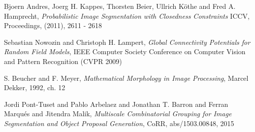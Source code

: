 \begin{thebibliography}{9}
 	Bjoern Andres, Joerg H. Kappes, Thorsten Beier, Ullrich Köthe and Fred A. Hamprecht, 
	\emph{Probabilistic Image Segmentation with Closedness Constraints}
	ICCV, Proceedings, (2011), 2611 - 2618

	Sebastian Nowozin and Christoph H. Lampert, 
	\emph{Global Connectivity Potentials for Random Field Models}, 
	IEEE Computer Society Conference on Computer Vision and Pattern Recognition (CVPR 2009)

 	S. Beucher and F. Meyer,
 	\emph{Mathematical  Morphology  in  Image  Processing}, 
 	Marcel Dekker, 1992, ch. 12

 	Jordi Pont{-}Tuset and Pablo Arbelaez and Jonathan T. Barron and Ferran Marqu{\'{e}}s and Jitendra Malik, 
 	\emph{Multiscale Combinatorial Grouping for Image Segmentation and Object Proposal Generation}, 
 	CoRR, abs/1503.00848, 2015

\end{thebibliography}

